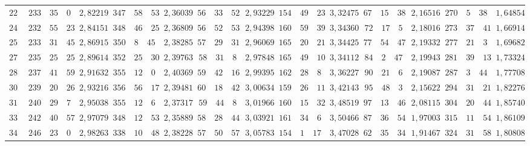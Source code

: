 \begin{landscape}
\begin{center}
\begin{tabular}{r|r|r|r|r|r|r|r|r|r|r|r|r}
\(225\) & \(233\quad 35\quad 0\) & \(2{,}82219\) & \(347\quad 58\quad 53\) & \(2{,}36039\) & \(56\quad 33\quad 52\) & \(2{,}93229\) & \(154\quad 49\quad 23\) & \(3{,}32475\) & \(67\quad 15\quad 38\) & \(2{,}16516\) & \(270\quad 5\quad 38\) & \(1{,}64854\) \\[3pt]
\(240\) & \(232\quad 55\quad 23\) & \(2{,}84151\) & \(348\quad 46\quad 25\) & \(2{,}36809\) & \(56\quad 52\quad 53\) & \(2{,}94398\) & \(160\quad 59\quad 39\) & \(3{,}34360\) & \(72\quad 17\quad 5\) & \(2{,}18016\) & \(273\quad 37\quad 41\) & \(1{,}66914\) \\
\(255\) & \(233\quad 31\quad 45\) & \(2{,}86915\) & \(350\quad 8\quad 45\) & \(2{,}38285\) & \(57\quad 29\quad 31\) & \(2{,}96069\) & \(165\quad 20\quad 21\) & \(3{,}34425\) & \(77\quad 54\quad 47\) & \(2{,}19332\) & \(277\quad 21\quad 3\) & \(1{,}69682\) \\
\(270\) & \(235\quad 25\quad 25\) & \(2{,}89614\) & \(352\quad 25\quad 30\) & \(2{,}39763\) & \(58\quad 31\quad 8\) & \(2{,}97848\) & \(165\quad 49\quad 10\) & \(3{,}34112\) & \(84\quad 2\quad 47\) & \(2{,}19943\) & \(281\quad 39\quad 13\) & \(1{,}73324\) \\
\(285\) & \(237\quad 41\quad 59\) & \(2{,}91632\) & \(355\quad 12\quad 0\) & \(2{,}40369\) & \(59\quad 42\quad 16\) & \(2{,}99395\) & \(162\quad 28\quad 8\) & \(3{,}36227\) & \(90\quad 21\quad 6\) & \(2{,}19087\) & \(287\quad 3\quad 44\) & \(1{,}77708\) \\[3pt]
\(300\) & \(239\quad 20\quad 26\) & \(2{,}93216\) & \(356\quad 56\quad 17\) & \(2{,}39481\) & \(60\quad 18\quad 42\) & \(3{,}00634\) & \(159\quad 26\quad 11\) & \(3{,}42143\) & \(95\quad 48\quad 3\) & \(2{,}15622\) & \(294\quad 31\quad 21\) & \(1{,}82276\) \\
\(315\) & \(240\quad 29\quad 7\) & \(2{,}95038\) & \(355\quad 12\quad 6\) & \(2{,}37317\) & \(59\quad 44\quad 8\) & \(3{,}01966\) & \(160\quad 15\quad 32\) & \(3{,}48519\) & \(97\quad 13\quad 46\) & \(2{,}08115\) & \(304\quad 20\quad 44\) & \(1{,}85740\) \\
\(330\) & \(242\quad 40\quad 57\) & \(2{,}97079\) & \(348\quad 12\quad 53\) & \(2{,}35889\) & \(58\quad 28\quad 44\) & \(3{,}03921\) & \(161\quad 34\quad 6\) & \(3{,}50466\) & \(87\quad 36\quad 54\) & \(1{,}97003\) & \(315\quad 11\quad 54\) & \(1{,}86109\) \\
\(345\) & \(246\quad 23\quad 0\) & \(2{,}98263\) & \(338\quad 10\quad 48\) & \(2{,}38228\) & \(57\quad 50\quad 57\) & \(3{,}05783\) & \(154\quad 1\quad 17\) & \(3{,}47028\) & \(62\quad 35\quad 34\) & \(1{,}91467\) & \(324\quad 31\quad 58\) & \(1{,}80808\) \\
\end{tabular}
\end{center}
\endgroup
\end{landscape}
